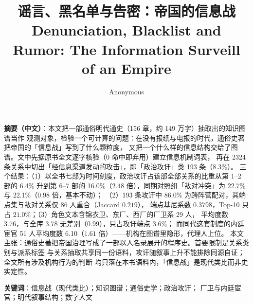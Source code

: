 \documentclass[conference]{IEEEtran}
\title{谣言、黑名单与告密：帝国的信息战\\[2pt]
\large Denunciation, Blacklist and Rumor: The Information Surveill\\
\large of an Empire}
\author{Anonymous}
\date{}
\begin{document}
\maketitle

\noindent\textbf{摘要（中文）}：本文把一部通俗明代通史（156 章，约 149 万字）抽取出的知识图谱当作
观测对象，检验一个可计算的问题：在没有报纸与电报的时代，通俗史著把帝国的「信息战」写到了什么颗粒度，
又把一个什么样的信息结构交给了图谱。文中先据原书全文逐字核验（0 命中即弃用）建立信息机制词表，
再在 2324 条关系中切出「经信息渠道发动的攻击」，即「政治攻讦」类 193 条（8.3\%）。
三个结果：（1）以全书七部为时间刻度，政治攻讦占该部全部关系的比重从第 1--2 部的 6.4\% 升到第 6--7 部的
16.0\%（$2.48$ 倍），同期对照组「敌对冲突」为 22.7\% 与 22.1\%（$0.98$ 倍，基本不动）；
（2）193 条攻讦中 86.0\% 为跨阵营配对，其端点集与敌对关系仅 86 人重合（Jaccard $0.219$），
端点基尼系数 0.3798，Top-10 只占 $21.0\%$；（3）角色文本含锦衣卫、东厂、西厂的厂卫系 29 人，
平均度数 3.76，与全库 3.78 无差别（$0.99$），只占攻讦端点 $3.6\%$；
而同代这套制度的内廷宦官 51 人平均度数 6.10（$1.61$ 倍）——机构在图谱里隐形，代理人上位。
本文主张：通俗史著把帝国治理写成了一部以人名录展开的程序史。首要限制是关系类别与派系标签
与关系抽取共享同一份语料，攻讦随叙事上升不能排除同源自证；全文所有涉及机构行为的判断
均只落在本书语料内，「信息战」是现代类比而非史实定性。

\noindent\textbf{关键词}：信息战（现代类比）；知识图谱；通俗史学；政治攻讦；
厂卫与内廷宦官；明代叙事结构；数字人文
\end{document}
